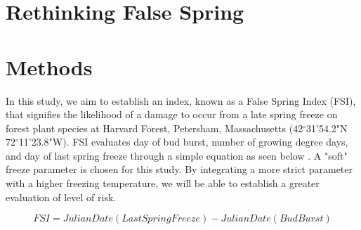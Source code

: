 \documentclass{article}
\begin{document}
\section*{Rethinking False Spring}

\section*{Methods}

In this study, we aim to establish an index, known as a False Spring Index (FSI), that signifies the likelihood of a damage to occur from a late spring freeze on forest plant species at Harvard Forest, Petersham, Massachusetts (42$^{\circ}$31'54.2"N 72$^{\circ}$11'23.8"W). FSI evaluates day of bud burst, number of growing degree days, and day of last spring freeze through a simple equation as seen below \cite{Marino2011}. A "soft" freeze parameter is chosen for this study. By integrating a more strict parameter with a higher freezing temperature, we will be able to establish a greater evaluation of level of risk. 

\[ FSI = Julian Date (Last Spring Freeze) - Julian Date (Bud Burst) \]
\end{document}
